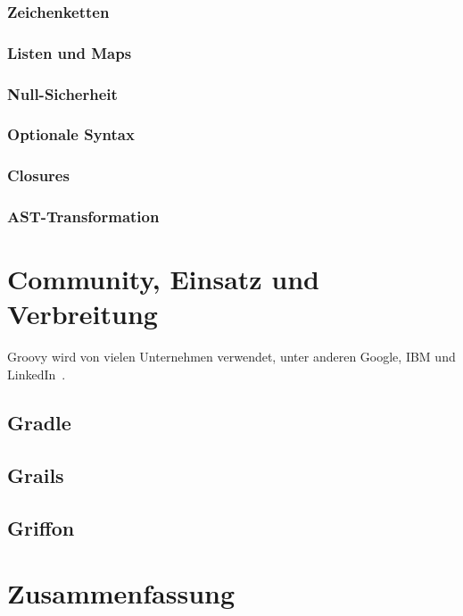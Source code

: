 	\subsubsection{Zeichenketten}\label{subsubsec:strings}

	\subsubsection{Listen und Maps}

	\subsubsection{Null-Sicherheit}

	\subsubsection{Optionale Syntax}\label{subsubsec:optionale-syntax}

	\subsubsection{Closures}

	\subsubsection{AST-Transformation}


	\section{Community, Einsatz und Verbreitung}\label{sec:community}

	Groovy wird von vielen Unternehmen verwendet, unter anderen Google, IBM und LinkedIn~\cite{groovy-lang:main,wiki:Groovy}.

	\subsection{Gradle}\label{subsec:gradle}

	\subsection{Grails}\label{subsec:grails}

	\subsection{Griffon}\label{subsec:griffon}


	\section{Zusammenfassung}\label{sec:zusammenfassung}


	
	


